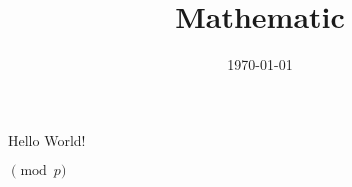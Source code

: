 \documentclass{book}
\title{Mathematic}
\author{}
\date{\today}
\begin{document}
\maketitle

Hello World!

\(\pmod{p}\)
\end{document}
